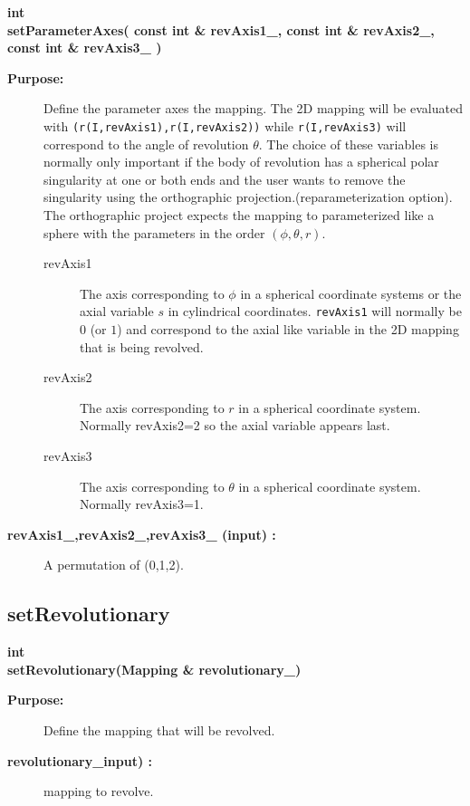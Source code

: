 \begin{flushleft} \textbf{%
int   \\ 
\settowidth{\RevolutionMappingIncludeArgIndent}{setParameterAxes(}%
setParameterAxes( const int \& revAxis1\_, const int \& revAxis2\_, const int \& revAxis3\_ )
}\end{flushleft}
\begin{description}
\item[{\bf Purpose:}]  Define the parameter axes the mapping. The 2D mapping will
   be evaluated with {\tt (r(I,revAxis1),\-r(I,revAxis2))} while {\tt r(I,revAxis3)}
   will correspond to the angle of revolution $\theta$.
   The choice of these variables is normally only important if the body of revolution
   has a spherical polar singularity at one or both ends and the user wants to remove
   the singularity using the orthographic projection.(reparameterization option). The
   orthographic project expects the mapping to parameterized like a sphere with
   the parameters in the order $(\phi,\theta,r)$. 

  \begin{description}
    \item[revAxis1] The axis corresponding to $\phi$ in a spherical coordinate systems 
         or the axial variable $s$ in cylindrical  coordinates. {\tt revAxis1} will
         normally be $0$ (or $1$) and correspond to the axial like variable in the 2D mapping
         that is being revolved.
    \item[revAxis2] The axis corresponding to $r$ in a spherical coordinate system. Normally
          {revAxis2=2} so the axial variable appears last.
    \item[revAxis3] The axis corresponding to $\theta$ in a spherical coordinate system. Normally
        {revAxis3=1}.
  \end{description}
   
\item[{\bf revAxis1\_,revAxis2\_,revAxis3\_ (input) :}]  A permutation of (0,1,2).
\end{description}
\subsection{setRevolutionary}
 
\begin{flushleft} \textbf{%
int   \\ 
\settowidth{\RevolutionMappingIncludeArgIndent}{setRevolutionary(}%
setRevolutionary(Mapping \& revolutionary\_)
}\end{flushleft}
\begin{description}
\item[{\bf Purpose:}]  Define the mapping that will be revolved.
\item[{\bf revolutionary\_input) :}]  mapping to revolve.
\end{description}
